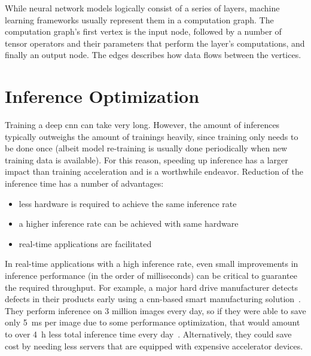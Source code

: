 While neural network models logically consist of a series of layers, machine learning frameworks usually represent them in a computation graph. The computation graph's first vertex is the input node, followed by a number of tensor operators and their parameters that perform the layer's computations, and finally an output node. The edges describes how data flows between the vertices.

\section{Inference Optimization}
Training a deep \gls{cnn} can take very long. However, the amount of inferences typically outweighs the amount of trainings heavily, since training only needs to be done once (albeit model re-training is usually done periodically when new training data is available). For this reason, speeding up inference has a larger impact than training acceleration and is a worthwhile endeavor. 
Reduction of the inference time has a number of advantages:
\begin{itemize}
	\item less hardware is required to achieve the same inference rate
	\item a higher inference rate can be achieved with same hardware
	\item real-time applications are facilitated
\end{itemize}
In real-time applications with a high inference rate, even small improvements in inference performance (in the order of milliseconds) can be critical to guarantee the required throughput.
For example, a major hard drive manufacturer detects defects in their products early using a \gls{cnn}-based smart manufacturing solution~\cite[p.~11]{LyveDataLabs.2019}. They perform inference on 3 million images every day, so if they were able to save only \SI{5}{\milli\second} per image due to some performance optimization, that would amount to over \SI{4}{\hour} less total inference time every day~\cite{Seagate.2019}. Alternatively, they could save cost by needing less servers that are equipped with expensive accelerator devices.

